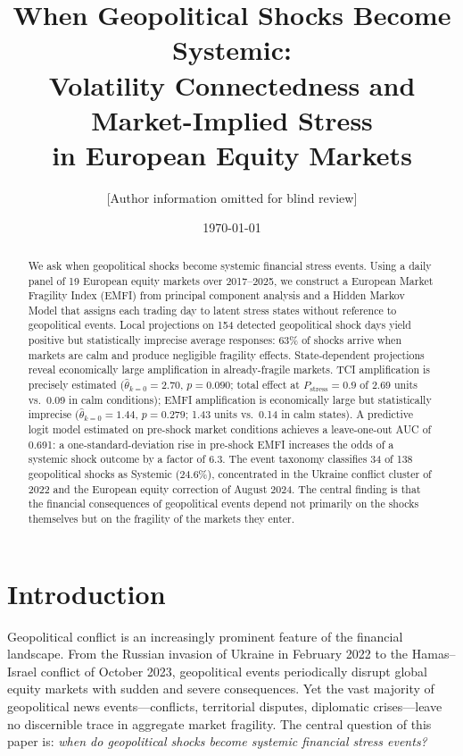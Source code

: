 \documentclass[11pt]{article}
\title{When Geopolitical Shocks Become Systemic:\\
  Volatility Connectedness and Market-Implied Stress\\
  in European Equity Markets}
\author{[Author information omitted for blind review]}
\date{\today}
\begin{document}
\maketitle

\begin{abstract}
We ask when geopolitical shocks become systemic financial stress events.
Using a daily panel of 19 European equity markets over 2017--2025, we
construct a European Market Fragility Index (EMFI) from principal component
analysis and a Hidden Markov Model that assigns each trading day to latent
stress states without reference to geopolitical events.
Local projections on 154 detected geopolitical shock days yield positive but
statistically imprecise average responses: 63\% of shocks arrive when markets
are calm and produce negligible fragility effects.
State-dependent projections reveal economically large amplification in
already-fragile markets. TCI amplification is precisely estimated
($\hat\theta_{k=0} = 2.70$, $p = 0.090$; total effect at
$P_{\mathrm{stress}} = 0.9$ of 2.69 units vs.\ 0.09 in calm conditions);
EMFI amplification is economically large but statistically imprecise
($\hat\theta_{k=0} = 1.44$, $p = 0.279$; 1.43 units vs.\ 0.14 in calm states).
A predictive logit model estimated on pre-shock market conditions achieves
a leave-one-out AUC of 0.691: a one-standard-deviation rise in pre-shock
EMFI increases the odds of a systemic shock outcome by a factor of 6.3.
The event taxonomy classifies 34 of 138 geopolitical shocks as Systemic (24.6\%),
concentrated in the Ukraine conflict cluster of 2022 and the European equity correction of August 2024.
The central finding is that the financial consequences of geopolitical events
depend not primarily on the shocks themselves but on the fragility of the
markets they enter.
\end{abstract}

\newpage
\tableofcontents
\newpage

\section{Introduction}
\label{sec:introduction}

Geopolitical conflict is an increasingly prominent feature of the financial
landscape. From the Russian invasion of Ukraine in February 2022 to the
Hamas--Israel conflict of October 2023, geopolitical events periodically
disrupt global equity markets with sudden and severe consequences.
Yet the vast majority of geopolitical news events---conflicts, territorial
disputes, diplomatic crises---leave no discernible trace in aggregate market
fragility. The central question of this paper is: \emph{when do geopolitical
shocks become systemic financial stress events?}
\end{document}
